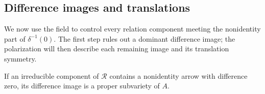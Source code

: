 \subsection{Difference images and translations}\label{quot:differences}

We now use the field to control every relation component meeting the
nonidentity part of \(\delta^{-1}(0)\).  The first step rules out a
dominant difference image; the polarization will then describe each
remaining image and its translation symmetry.

\begin{lemma}
\label{quot:nondominance}
If an irreducible component of \(\mathcal R\) contains a nonidentity
arrow with difference zero, its difference image is a proper
subvariety of \(A\).
\end{lemma}

